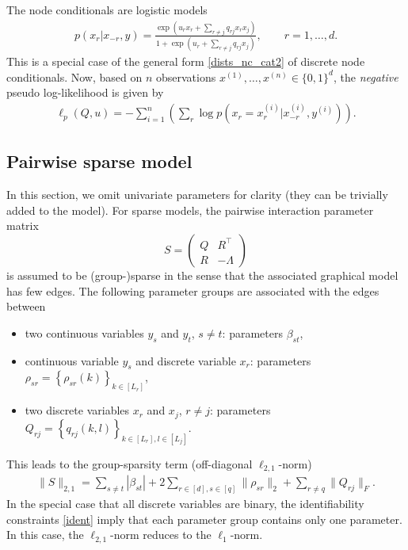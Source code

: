 \documentclass{article}
\newcommand{\bPc}[1]{\ensuremath{\left\{#1 \right\}}} %
\newcommand{\bPr}[1]{\ensuremath{\left(#1 \right)}} %
\begin{document}
The node conditionals are logistic models
\begin{align*}
p(x_r|x_{-r},y)
= \frac{\exp\bPr{u_r x_r +\sum_{r\neq j}q_{rj}x_rx_j }}
{1 +  \exp\bPr{u_r +\sum_{r\neq j}q_{rj}x_j } },\qquad r=1,\ldots, d  . 
\end{align*}
This is a special case of the general form \eqref{dists_nc_cat2} of discrete node conditionals.
Now, based on $n$ observations $x^{(1)}, \ldots, x^{(n)}\in\{0,1\}^{d}$, 
the \emph{negative} pseudo log-likelihood is given by 
\begin{align}
 \ell_p(Q, u) = -\sum_{i=1}^n \bPr{\sum_r \log p(x_r = x_r^{(i)}|x_{-r}^{(i)},y^{(i)}) } . \label{plh_ising}
\end{align}

\subsection{Pairwise sparse model}
In this section, we omit univariate parameters for clarity (they can be trivially added to the model).
For sparse models, the pairwise interaction parameter matrix 
\[S = \begin{pmatrix} Q  & R^\top \\ R & -\Lambda\end{pmatrix}\]
is assumed to be (group-)sparse in the sense that the associated graphical model has few edges. The following parameter groups are associated with the edges between
\begin{itemize}
	\item two continuous variables $y_s$ and $y_t$, $s\neq t$: parameters $\beta_{st}$,
	\item continuous variable $y_s$ and discrete variable $x_r$: parameters $\rho_{sr}=\bPc{\rho_{sr}(k)}_{k\in [L_r]}$,
	\item two discrete variables $x_r$ and $x_j$, $r\neq j$: parameters $Q_{rj}=\bPc{q_{rj}(k,l)}_{k\in[L_r], l\in[L_j]}$.
\end{itemize}
This leads to the group-sparsity term (off-diagonal $\ell_{2,1}$-norm)
\begin{align*}
\|S\|_{2,1} = \sum_{s\neq t} |\beta_{st}| + 2\sum_{r\in[d], s\in[q]} \|\rho_{sr}\|_2 + \sum_{r\neq q} \|Q_{rj}\|_F.
\end{align*} %
In the special case that all discrete variables are binary, the identifiability constraints \eqref{ident} imply that each parameter group contains only one parameter. In this case, the $\ell_{2,1}$-norm reduces to the $\ell_1$-norm.
\medskip
\end{document}
